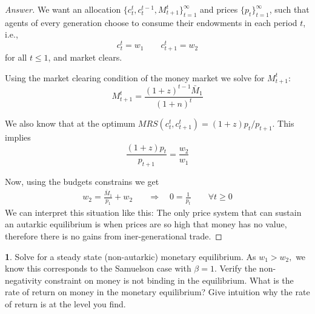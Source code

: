 \documentclass{article}
\theoremstyle{definition}
\newtheorem{subproblem}{}[problem]
\begin{document}
\begin{proof}[Answer]
We want an allocation $\{c_t^t, c_t^{t-1},M_{t+1}^t \}_{t=1}^\infty$ and prices $\{p_t \}_{t=1}^\infty$, such that 
 agents of every generation choose to consume their endowments in each period $t$, i.e., 
        $$c_t^{t} = w_1
        \qquad c_{t+1}^{t} = w_2 $$
for all $t\leq1$, and market clears.

Using the market clearing condition of the money market we solve for $M_{t+1}^t$:
\begin{equation}
   {M_{t+1}^t} = \frac{(1+z)^{t-1} \bar{M}_1 }{(1+n)^{t} }
\end{equation}

We also know that at the optimum $MRS(c_t^t, c^{t}_{t+1})=(1+z)p_{t}/p_{t+1}$. This implies
\begin{equation}
    \frac{(1+z)p_{t}}{p_{t+1}} = \frac{w_2}{w_1} 
\end{equation}

Now, using the budgets constrains we get
\begin{align*}
w_2 = \frac{\bar{M}_1}{p_{1}} +  w_2 \quad &\Rightarrow \quad 0 = \frac{1}{p_{t}} \qquad \forall t\geq 0
\end{align*}
We can interpret this situation like this: The only price system that can sustain an autarkic equilibrium is when prices are so high that money has no value, therefore there is no gains from iner-generational trade.

\end{proof}

\begin{subproblem}
Solve for a steady state (non-autarkic) monetary equilibrium. As $w_{1}>w_{2},$ we know this
corresponds to the Samuelson case with $\beta=1 .$ Verify the non-negativity constraint on
money is not binding in the equilibrium. What is the rate of return on money in the monetary
equilibrium? Give intuition why the rate of return is at the level you find.
\end{subproblem}
\end{document}

